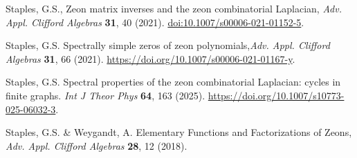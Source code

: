 \documentclass{article}
\theoremstyle{definition}
\numberwithin{equation}{section}
\begin{document}
\begin{thebibliography}{}
 Staples, G.S., Zeon matrix inverses and the zeon combinatorial Laplacian, {\it Adv. Appl. Clifford Algebras} {\bf 31}, 40 (2021).    \url{doi:10.1007/s00006-021-01152-5}.

 Staples, G.S. Spectrally simple zeros of zeon polynomials,{\it Adv. Appl. Clifford Algebras} {\bf 31}, 66 (2021).  \url{https://doi.org/10.1007/s00006-021-01167-y}.

 Staples, G.S. Spectral properties of the zeon combinatorial Laplacian: cycles in finite graphs. {\em Int J Theor Phys} {\bf 64}, 163 (2025). \url{https://doi.org/10.1007/s10773-025-06032-3}.


 Staples, G.S. \& Weygandt, A. Elementary Functions and Factorizations of Zeons, {\it Adv. Appl. Clifford Algebras} {\bf 28}, 12 (2018).



\end{thebibliography}
\end{document}
